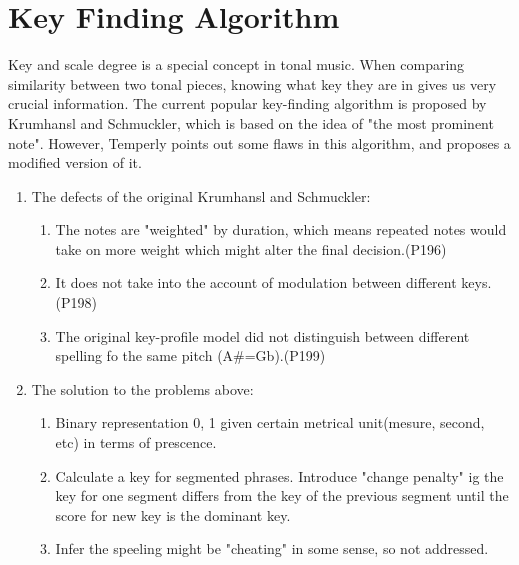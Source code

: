 \documentclass[12pt]{report}
\theoremstyle{definition}
\begin{document}
\section{Key Finding Algorithm}
Key and scale degree is a special concept in tonal music. When comparing 
similarity between two tonal pieces, knowing what key they are in gives us
very crucial information. The current popular key-finding algorithm is
proposed by Krumhansl and Schmuckler, which is based on the idea of
"the most prominent note". However, Temperly points out some flaws in this
algorithm, and proposes a modified version of it. 
\begin{enumerate}
    \item The defects of the original Krumhansl and Schmuckler:
    \begin{enumerate}
        \item The notes are "weighted" by duration, which means repeated notes would take on more weight which might alter the final decision.(P196)
        \item It does not take into the account of modulation between different keys.(P198)
        \item The original key-profile model did not distinguish between different spelling fo the same pitch (A#=Gb).(P199)
    \end{enumerate}
    \item The solution to the problems above:
    \begin{enumerate}
        \item Binary representation { 0, 1 } given certain metrical unit(mesure, second, etc) in terms of prescence.
        \item Calculate a key for segmented phrases. Introduce "change penalty" ig the key for one segment differs from the key of the previous segment until the score for new key is the dominant key.
        \item Infer the speeling might be "cheating" in some sense, so not addressed.
    \end{enumerate}
\end{enumerate}
\end{document}
